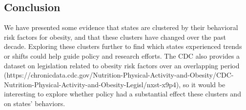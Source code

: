 \documentclass[11pt]{article}
\begin{document}
\subsection{Conclusion}
We have presented some evidence that states are clustered by their behavioral risk factors for obesity, and that these clusters have changed over the past decade. Exploring these clusters further to find which states experienced trends or shifts could help guide policy and research efforts. The CDC also provides a dataset on legislation related to obesity risk factors over an overlapping period (https://chronicdata.cdc.gov/Nutrition-Physical-Activity-and-Obesity/CDC-Nutrition-Physical-Activity-and-Obesity-Legisl/nxst-x9p4), so it would be interesting to explore whether policy had a substantial effect these clusters and on states' behaviors. 
 
\end{document}
